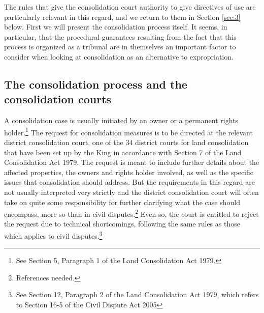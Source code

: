 The rules that give the consolidation court authority to give directives of use are particularly relevant in this regard, and we return to them in Section \ref{sec:3} below. First we will present the consolidation process itself. It seems, in particular, that the procedural guarantees resulting from the fact that this process is organized as a tribunal are in themselves an important factor to consider when looking at consolidation as an alternative to expropriation.

\subsection{The consolidation process and the consolidation courts}\label{subsec:21}

A consolidation case is usually initiated by an owner or a permanent rights holder.\footnote{See Section 5, Paragraph 1 of the Land Consolidation Act 1979.} The request for consolidation measures is to be directed at the relevant district consolidation court, one of the 34 district courts for land consolidation that have been set up by the King in accordance with Section 7 of the Land Consolidation Act 1979. The request is meant to include further details about the affected properties, the owners and rights holder involved, as well as the specific issues that consolidation should address. But the requirements in this regard are not usually interpreted very strictly and the district consolidation court will often take on quite some responsibility for further clarifying what the case should encompass, more so than in civil disputes.\footnote{References needed.} Even so, the court is entitled to reject the request due to technical shortcomings, following the same rules as those which applies to civil disputes.\footnote{See Section 12, Paragraph 2 of the Land Consolidation Act 1979, which refers to Section 16-5 of the Civil Dispute Act 2005}

